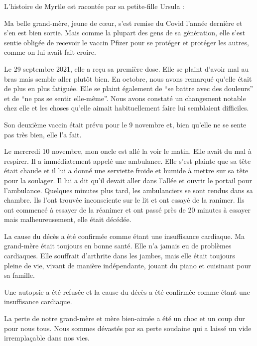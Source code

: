 L'histoire de Myrtle est racontée par sa petite-fille Ursula :

Ma belle grand-mère, jeune de cœur, s'est remise du Covid l'année dernière et
s'en est bien sortie. Mais comme la plupart des gens de sa génération, elle
s'est sentie obligée de recevoir le vaccin Pfizer pour se protéger et protéger
les autres, comme on lui avait fait croire.

Le 29 septembre 2021, elle a reçu sa première dose. Elle se plaint d'avoir mal
au bras mais semble aller plutôt bien. En octobre, nous avons remarqué qu'elle
était de plus en plus fatiguée. Elle se plaint également de “se battre avec des
douleurs” et de “ne pas se sentir elle-même”. Nous avons constaté un changement
notable chez elle et les choses qu'elle aimait habituellement faire lui
semblaient difficiles.

Son deuxième vaccin était prévu pour le 9 novembre et, bien qu'elle ne se sente
pas très bien, elle l'a fait.

Le mercredi 10 novembre, mon oncle est allé la voir le matin. Elle avait du mal
à respirer. Il a immédiatement appelé une ambulance. Elle s'est plainte que sa
tête était chaude et il lui a donné une serviette froide et humide à mettre sur
sa tête pour la soulager. Il lui a dit qu'il devait aller dans l'allée et ouvrir
le portail pour l'ambulance. Quelques minutes plus tard, les ambulanciers se
sont rendus dans sa chambre. Ils l'ont trouvée inconsciente sur le lit et ont
essayé de la ranimer. Ils ont commencé à essayer de la réanimer et ont passé
près de 20 minutes à essayer mais malheureusement, elle était décédée.

La cause du décès a été confirmée comme étant une insuffisance cardiaque. Ma
grand-mère était toujours en bonne santé. Elle n'a jamais eu de problèmes
cardiaques. Elle souffrait d'arthrite dans les jambes, mais elle était toujours
pleine de vie, vivant de manière indépendante, jouant du piano et cuisinant pour
sa famille.

Une autopsie a été refusée et la cause du décès a été confirmée comme étant une
insuffisance cardiaque.

La perte de notre grand-mère et mère bien-aimée a été un choc et un coup dur
pour nous tous. Nous sommes dévastés par sa perte soudaine qui a laissé un vide
irremplaçable dans nos vies.
